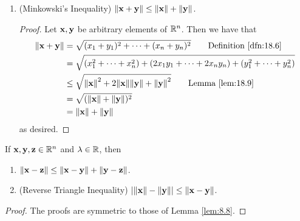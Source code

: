\documentclass[../main.tex]{subfiles}
\begin{document}
\begin{theorem}
\begin{enumerate}[label=\textup{(}\alph*\textup{)},ref={\thetheorem\alph*}]
\begin{proof}
            Let $\lambda$ be an arbitrary element of $\R$, and let $\x$ be an arbitrary element of $\R^n$. Then we have that
            \begin{align*}
                \norm{\lambda\x} &= \sqrt{(\lambda x_1)^2+\cdots+(\lambda x_n)^2}\tag*{Definition \ref{dfn:18.6}}\\
                &= |\lambda|\cdot\sqrt{x_1^2+\cdots+x_n^2}\\
                &= |\lambda|\cdot\norm{\x}\tag*{Definition \ref{dfn:18.6}}
            \end{align*}
            as desired.
        \end{proof}
        \item \label{trm:18.10c}\textup{(}Minkowski's Inequality\textup{)} $\norm{\mathbf{x}+\mathbf{y}}\leq\norm{\mathbf{x}}+\norm{\mathbf{y}}$.
        \begin{proof}
            Let $\mathbf{x},\mathbf{y}$ be arbitrary elements of $\R^n$. Then we have that
            \begin{align*}
                \norm{\x+\y} &= \sqrt{(x_1+y_1)^2+\cdots+(x_n+y_n)^2}\tag*{Definition \ref{dfn:18.6}}\\
                &= \sqrt{(x_1^2+\cdots+x_n^2)+(2x_1y_1+\cdots+2x_ny_n)+(y_1^2+\cdots+y_n^2)}\\
                &\leq \sqrt{\norm{\x}^2+2\norm{\x}\norm{\y}+\norm{\y}^2}\tag*{Lemma \ref{lem:18.9}}\\
                &= \sqrt{(\norm{\x}+\norm{\y})^2}\\
                &= \norm{\x}+\norm{\y}
            \end{align*}
            as desired.
        \end{proof}
    \end{enumerate}
\end{theorem}

\begin{corollary}\label{cly:18.11}
    If $\mathbf{x},\mathbf{y},\mathbf{z}\in\mathbb{R}^n$ and $\lambda\in\mathbb{R}$, then
    \begin{enumerate}[label=\textup{(}\alph*\textup{)}]
        \item $\norm{\mathbf{x}-\mathbf{z}}\leq\norm{\mathbf{x}-\mathbf{y}}+\norm{\mathbf{y}-\mathbf{z}}$.
        \item \textup{(}Reverse Triangle Inequality\textup{)} $|\norm{\mathbf{x}}-\norm{\mathbf{y}}|\leq\norm{\mathbf{x}-\mathbf{y}}$.
    \end{enumerate}
    \begin{proof}
        The proofs are symmetric to those of Lemma \ref{lem:8.8}.
    \end{proof}
\end{corollary}
\end{document}
